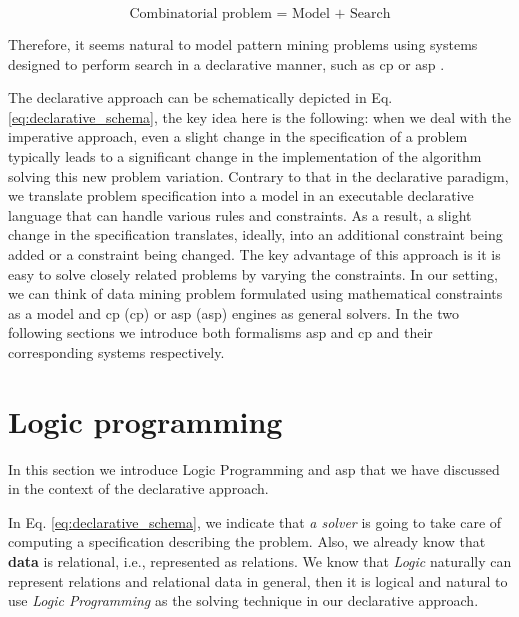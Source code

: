\begin{center}
\begin{equation}\label{eq:declarative_schema}
  \text{Combinatorial problem = Model + Search}
\end{equation}
\end{center}

Therefore, it seems natural to model pattern mining problems 
using systems designed to perform search in a declarative manner, such
as \acrlong{cp} \parencite{handbookcp} or \acrlong{asp}
\parencite{whatisasp}. %

\pubrev


The declarative approach can be schematically depicted in Eq.
\ref{eq:declarative_schema}, the key idea here is the following: when
we deal with the imperative approach, even a slight change in the
specification of a problem typically leads to a significant change in
the implementation of the algorithm solving this new problem
variation. Contrary to that in the declarative paradigm, we translate
problem specification into a model in an executable declarative language that can
handle various rules and constraints. As a result, a slight change in
the specification translates, ideally, into an additional constraint
being added or a constraint being changed. The key advantage of this
approach is it is easy to solve  closely related problems by varying
the constraints. In our setting, we can think of data
mining problem formulated using mathematical constraints as a
model and \acrlong{cp} (\acrshort{cp}) or \acrlong{asp}
(\acrshort{asp}) engines
as general solvers. In the two following sections we introduce both
formalisms \acrshort{asp} and \acrshort{cp} and their corresponding systems respectively.



\section{Logic programming}\label{sec:logic_programming}
In this section we introduce Logic Programming and \acrlong{asp} that
we have discussed in the context of the declarative approach.


\pubrev
In Eq. \ref{eq:declarative_schema}, we indicate that \textit{a solver}
is going to take care of computing a specification describing the
problem. Also, we already know that \textbf{data} is relational, i.e., represented as relations. We know that \textit{Logic} naturally can represent relations and relational data in general, then it is logical and natural to use \textit{Logic Programming} as the solving technique in our declarative approach.
\pubrev


